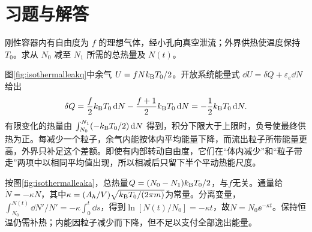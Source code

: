 \section{习题与解答}
\begin{exercise}[恒温泄流所需热量]
刚性容器内有自由度为 $f$ 的理想气体，经小孔向真空泄流；外界供热使温度保持 $T_0$。求从 $N_0$ 减至 $N_1$ 所需的总热量及 $N(t)$。
\end{exercise}
\begin{solution}
图\ref{fig:isothermalleakq}中余气 $U=fNk_{\mathrm B} T_0/2$。开放系统能量式 $\dd U=\delta Q+\varepsilon_e\dd N$ 给出
\[
 \delta Q=\frac f2k_{\mathrm B} T_0\mathop{}\!\mathrm d N-\frac{f+1}2k_{\mathrm B} T_0\mathop{}\!\mathrm d N
 =-\frac12k_{\mathrm B} T_0\mathop{}\!\mathrm d N.
\]
有限变化的热量由 $\int_{N_0}^{N_1}(-k_{\mathrm B} T_0/2)\mathop{}\!\mathrm d N$ 得到，积分下限大于上限时，负号使最终供热为正。每减少一个粒子，余气内能按体内平均能量下降，而流出粒子所带能量更高，外界只补足这个差额。即使有内部转动自由度，它们在“体内减少”和“粒子带走”两项中以相同平均值出现，所以相减后只留下半个平动热能尺度。

按图\ref{fig:isothermalleaka}，总热量$Q=(N_0-N_1)k_{\mathrm B} T_0/2$，与$f$无关。通量给$\dot N=-\kappa N$，其中$\kappa=(A_h/V)\sqrt{k_{\mathrm B} T_0/(2\pi m)}$为常量。分离变量，$\int_{N_0}^{N(t)}\dd N'/N'=-\kappa\int_0^t\dd s$，得到$\ln[N(t)/N_0]=-\kappa t$，故$N=N_0\ee^{-\kappa t}$。保持恒温仍需补热；内能因粒子减少而下降，但不足以支付全部逸出能量。
\end{solution}

